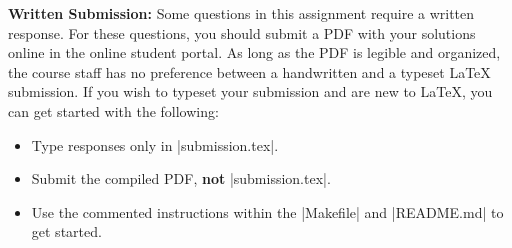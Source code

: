 {\bf Written Submission:}
Some questions in this assignment require a written response.  For these questions, you should submit a PDF
with your solutions online in the online student portal. As long as the PDF is legible and organized, the course
staff has no preference between a handwritten and a typeset \LaTeX{} submission.
If you wish to typeset your submission and are new to \LaTeX{}, you can get started with the following:
\begin{itemize}
  \item Type responses only in |submission.tex|.
  \item Submit the compiled PDF, {\bf not} |submission.tex|.
  \item Use the commented instructions within the |Makefile| and |README.md| to
  get started.
\end{itemize}
